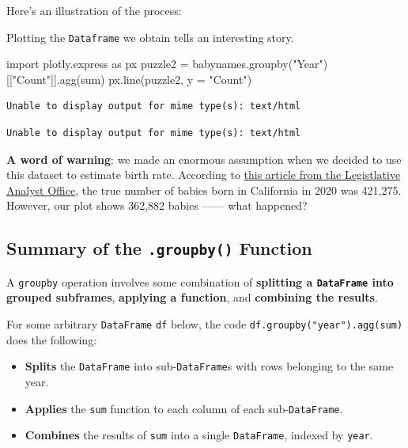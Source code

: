 \documentclass[
  letterpaper,
  DIV=11,
  numbers=noendperiod]{scrreprt}
\newenvironment{Shaded}{\begin{snugshade}}{\end{snugshade}}
\newcommand{\BuiltInTok}[1]{\textcolor[rgb]{0.00,0.23,0.31}{#1}}
\newcommand{\ImportTok}[1]{\textcolor[rgb]{0.00,0.46,0.62}{#1}}
\newcommand{\NormalTok}[1]{\textcolor[rgb]{0.00,0.23,0.31}{#1}}
\newcommand{\OperatorTok}[1]{\textcolor[rgb]{0.37,0.37,0.37}{#1}}
\newcommand{\StringTok}[1]{\textcolor[rgb]{0.13,0.47,0.30}{#1}}
\providecommand{\tightlist}{%
  \setlength{\itemsep}{0pt}\setlength{\parskip}{0pt}}\usepackage{longtable,booktabs,array}
\begin{document}
Here's an illustration of the process:

Plotting the \texttt{Dataframe} we obtain tells an interesting story.

\begin{Shaded}
\begin{Highlighting}[]
\ImportTok{import}\NormalTok{ plotly.express }\ImportTok{as}\NormalTok{ px}
\NormalTok{puzzle2 }\OperatorTok{=}\NormalTok{ babynames.groupby(}\StringTok{"Year"}\NormalTok{)[[}\StringTok{"Count"}\NormalTok{]].agg(}\BuiltInTok{sum}\NormalTok{)}
\NormalTok{px.line(puzzle2, y }\OperatorTok{=} \StringTok{"Count"}\NormalTok{)}
\end{Highlighting}
\end{Shaded}

\begin{verbatim}
Unable to display output for mime type(s): text/html
\end{verbatim}

\begin{verbatim}
Unable to display output for mime type(s): text/html
\end{verbatim}

\textbf{A word of warning}: we made an enormous assumption when we
decided to use this dataset to estimate birth rate. According to
\href{https://lao.ca.gov/LAOEconTax/Article/Detail/691}{this article
from the Legistlative Analyst Office}, the true number of babies born in
California in 2020 was 421,275. However, our plot shows 362,882 babies
------ what happened?

\hypertarget{summary-of-the-.groupby-function}{%
\subsection{\texorpdfstring{Summary of the \texttt{.groupby()}
Function}{Summary of the .groupby() Function}}\label{summary-of-the-.groupby-function}}

A \texttt{groupby} operation involves some combination of
\textbf{splitting a \texttt{DataFrame} into grouped subframes},
\textbf{applying a function}, and \textbf{combining the results}.

For some arbitrary \texttt{DataFrame} \texttt{df} below, the code
\texttt{df.groupby("year").agg(sum)} does the following:

\begin{itemize}
\tightlist
\item
  \textbf{Splits} the \texttt{DataFrame} into sub-\texttt{DataFrame}s
  with rows belonging to the same year.
\item
  \textbf{Applies} the \texttt{sum} function to each column of each
  sub-\texttt{DataFrame}.
\item
  \textbf{Combines} the results of \texttt{sum} into a single
  \texttt{DataFrame}, indexed by \texttt{year}.
\end{itemize}
\end{document}
